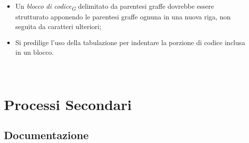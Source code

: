 \documentclass[a4paper, 12pt]{article}
\begin{document}
\begin{itemize}
    \item Un \textit{blocco di codice\textsubscript{G}} delimitato da parentesi graffe dovrebbe essere strutturato apponendo le parentesi graffe ognuna in una nuova riga, non seguita da caratteri ulteriori;
    \item Si predilige l'uso della tabulazione per indentare la porzione di codice inclusa in un blocco.
\paragraph{}\\
\end{itemize}
\newpage

\section{Processi Secondari}
\subsection{Documentazione}
\end{document}
